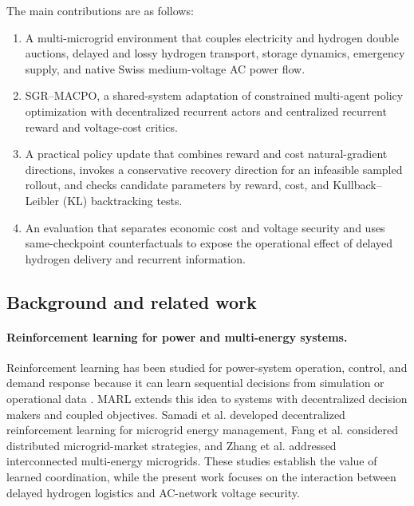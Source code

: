 \documentclass[final,5p,times]{elsarticle}
\newcommand{\method}{SGR--MACPO\xspace}
\begin{document}
The main contributions are as follows:
\begin{enumerate}
  \item A multi-microgrid environment that couples electricity and hydrogen double auctions, delayed and lossy hydrogen transport, storage dynamics, emergency supply, and native Swiss medium-voltage AC power flow.
  \item \method, a shared-system adaptation of constrained multi-agent policy optimization with decentralized recurrent actors and centralized recurrent reward and voltage-cost critics.
  \item A practical policy update that combines reward and cost natural-gradient directions, invokes a conservative recovery direction for an infeasible sampled rollout, and checks candidate parameters by reward, cost, and Kullback--Leibler (KL) backtracking tests.
  \item An evaluation that separates economic cost and voltage security and uses same-checkpoint counterfactuals to expose the operational effect of delayed hydrogen delivery and recurrent information.
\end{enumerate}

\subsection{Background and related work}
\label{sec:related}

\paragraph{Reinforcement learning for power and multi-energy systems.}

Reinforcement learning has been studied for power-system operation, control, and demand response because it can learn sequential decisions from simulation or operational data \cite{glavic2017reinforcement,cao2020review,bahrami2021demand,vazquez2019demand,francois2018deep}. MARL extends this idea to systems with decentralized decision makers and coupled objectives. Samadi et al. \cite{samadi2020decentralized} developed decentralized reinforcement learning for microgrid energy management, Fang et al. \cite{fang2021multiagent} considered distributed microgrid-market strategies, and Zhang et al. \cite{zhang2023interconnected} addressed interconnected multi-energy microgrids. These studies establish the value of learned coordination, while the present work focuses on the interaction between delayed hydrogen logistics and AC-network voltage security.
\end{document}
